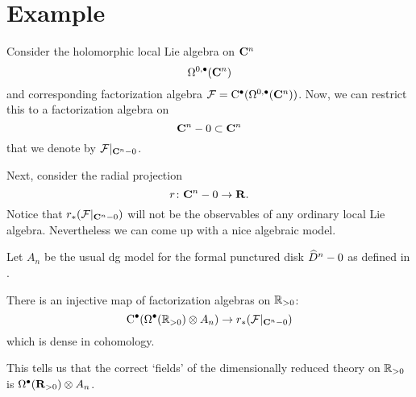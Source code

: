 \documentclass[11pt]{amsart}
\begin{document}
\section{Example} 

Consider the holomorphic local Lie algebra on $\C^n$
\[
\Omega^{0,\bu}(\C^n) 
\]
and corresponding factorization algebra $\cF = \clie^\bu(\Omega^{0,\bu}(\C^n))$. 
Now, we can restrict this to a factorization algebra on
\[
\C^n - 0 \subset \C^n
\]
that we denote by $\cF|_{\C^n - 0}$. 

Next, consider the radial projection
\[
r \colon \C^n - 0 \to \R .
\]
Notice that $r_* (\cF|_{\C^n - 0})$ will not be the observables of any ordinary local Lie algebra.
Nevertheless we can come up with a nice algebraic model.  

Let $A_n$ be the usual dg model for the formal punctured disk $\Hat{D}^n - 0$ as defined in \cite{FHK,GWkm}.

\begin{lem}
There is an injective map of factorization algebras on $\RR_{>0}$:
\[
\clie^\bu(\Omega^\bu(\RR_{>0}) \otimes A_n) \to r_* (\cF|_{\C^n - 0}) 
\]
which is dense in cohomology.
\end{lem}

This tells us that the correct `fields' of the dimensionally reduced theory on $\RR_{>0}$ is $\Omega^\bu(\R_{>0}) \otimes A_n$. 
\end{document}
